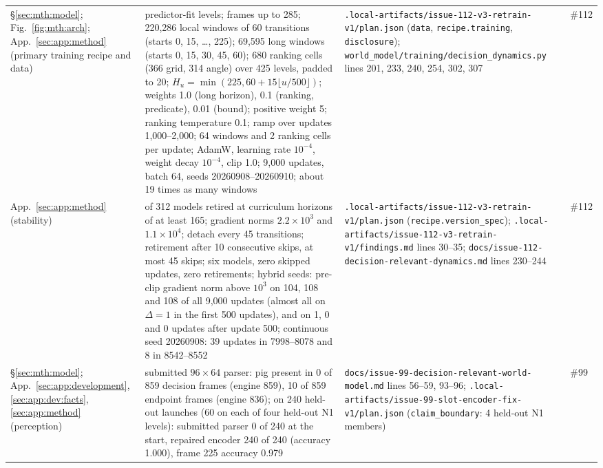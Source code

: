 {\begin{revblock}
\begin{longtable}{@{}>{\raggedright\arraybackslash}p{}>{\raggedright\arraybackslash}p{}>{\raggedright\arraybackslash}p{}>{\raggedright\arraybackslash}p{}@{}}
\S\ref{sec:mth:model}; Fig.~\ref{fig:mth:arch}; App.~\ref{sec:app:method} (primary training recipe and data) & 480 predictor-fit levels; frames up to 285; 220,286 local windows of 60 transitions (starts 0, 15, \dots, 225); 69,595 long windows (starts 0, 15, 30, 45, 60); 680 ranking cells (366 grid, 314 angle) over 425 levels, padded to 20; $H_u=\min(225,60+15\lfloor u/500\rfloor)$; weights 1.0 (long horizon), 0.1 (ranking, predicate), 0.01 (bound); positive weight 5; ranking temperature 0.1; ramp over updates 1,000--2,000; 64 windows and 2 ranking cells per update; AdamW, learning rate $10^{-4}$, weight decay $10^{-4}$, clip 1.0; 9,000 updates, batch 64, seeds 20260908--20260910; about 19 times as many windows & \nolinkurl{.local-artifacts/issue-112-v3-retrain-v1/plan.json} (\nolinkurl{data}, \nolinkurl{recipe.training}, \nolinkurl{disclosure}); \nolinkurl{world_model/training/decision_dynamics.py} lines 201, 233, 240, 254, 302, 307 & \#112 \\
App.~\ref{sec:app:method} (stability) & 28 of 312 models retired at curriculum horizons of at least 165; gradient norms $2.2\times10^{3}$ and $1.1\times10^{4}$; detach every 45 transitions; retirement after 10 consecutive skips, at most 45 skips; six models, zero skipped updates, zero retirements; hybrid seeds: pre-clip gradient norm above $10^{3}$ on 104, 108 and 108 of all 9,000 updates (almost all on $\Delta=1$ in the first 500 updates), and on 1, 0 and 0 updates after update 500; continuous seed 20260908: 39 updates in 7998--8078 and 8 in 8542--8552 & \nolinkurl{.local-artifacts/issue-112-v3-retrain-v1/plan.json} (\nolinkurl{recipe.version_spec}); \nolinkurl{.local-artifacts/issue-112-v3-retrain-v1/findings.md} lines 30--35; \nolinkurl{docs/issue-112-decision-relevant-dynamics.md} lines 230--244 & \#112 \\
\S\ref{sec:mth:model}; App.~\ref{sec:app:development}, \ref{sec:app:dev:facts}, \ref{sec:app:method} (perception) & submitted $96\times64$ parser: pig present in 0 of 859 decision frames (engine 859), 10 of 859 endpoint frames (engine 836); on 240 held-out launches (60 on each of four held-out N1 levels): submitted parser 0 of 240 at the start, repaired encoder 240 of 240 (accuracy 1.000), frame 225 accuracy 0.979 & \nolinkurl{docs/issue-99-decision-relevant-world-model.md} lines 56--59, 93--96; \nolinkurl{.local-artifacts/issue-99-slot-encoder-fix-v1/plan.json} (\nolinkurl{claim_boundary}: 4 held-out N1 members) & \#99 \\

\end{longtable}
\end{revblock}}
